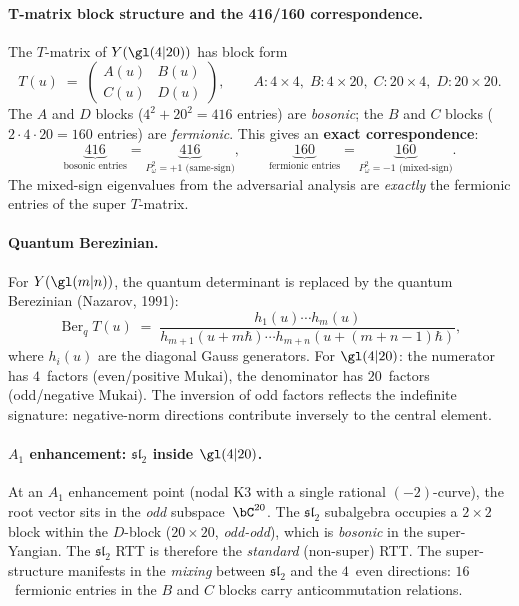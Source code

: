 \paragraph{T-matrix block structure and the 416/160 correspondence.}
The $T$-matrix of $Y(\gl(4|20))$ has block form
\[
  T(u) \;=\;
  \begin{pmatrix}
    A(u) & B(u) \\
    C(u) & D(u)
  \end{pmatrix},
  \qquad
  A \colon 4 \times 4,\;
  B \colon 4 \times 20,\;
  C \colon 20 \times 4,\;
  D \colon 20 \times 20.
\]
The $A$ and $D$ blocks ($4^2 + 20^2 = 416$ entries) are \emph{bosonic};
the $B$ and $C$ blocks ($2 \cdot 4 \cdot 20 = 160$ entries) are
\emph{fermionic}.
This gives an \textbf{exact correspondence}:
\[
  \underbrace{416}_{\text{bosonic entries}}
  = \underbrace{416}_{P_\omega^2 = +1 \text{ (same-sign)}},
  \qquad
  \underbrace{160}_{\text{fermionic entries}}
  = \underbrace{160}_{P_\omega^2 = -1 \text{ (mixed-sign)}}.
\]
The mixed-sign eigenvalues from the adversarial analysis are \emph{exactly}
the fermionic entries of the super $T$-matrix.

\paragraph{Quantum Berezinian.}
For $Y(\gl(m|n))$, the quantum determinant is replaced by the quantum
Berezinian (Nazarov, 1991):
\[
  \operatorname{Ber}_q T(u)
  \;=\;
  \frac{h_1(u) \cdots h_m(u)}{h_{m+1}(u + m\hbar) \cdots h_{m+n}(u + (m+n-1)\hbar)},
\]
where $h_i(u)$ are the diagonal Gauss generators.  For $\gl(4|20)$: the
numerator has $4$~factors (even/positive Mukai), the denominator has
$20$~factors (odd/negative Mukai).  The inversion of odd factors reflects
the indefinite signature: negative-norm directions contribute inversely
to the central element.

\paragraph{$A_1$ enhancement: $\mathfrak{sl}_2$ inside $\gl(4|20)$.}
At an $A_1$ enhancement point (nodal K3 with a single rational $(-2)$-curve),
the root vector sits in the \emph{odd} subspace~$\bC^{20}$.  The $\mathfrak{sl}_2$
subalgebra occupies a $2 \times 2$ block within the $D$-block ($20 \times 20$,
\emph{odd-odd}), which is \emph{bosonic} in the super-Yangian.  The
$\mathfrak{sl}_2$ RTT is therefore the \emph{standard} (non-super) RTT.
The super-structure manifests in the \emph{mixing} between $\mathfrak{sl}_2$
and the $4$~even directions: $16$~fermionic entries in the $B$ and $C$ blocks
carry anticommutation relations.

